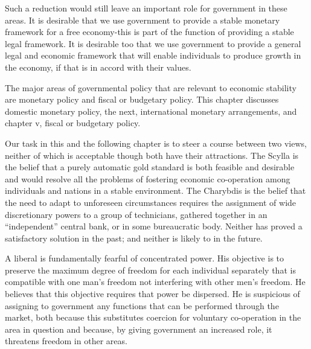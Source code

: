 \documentclass[11pt,openany]{book}
\begin{document}
Such a reduction would still leave an important role for government in these areas. It is desirable that we use government to provide a stable monetary framework for a free economy-this is part of the function of providing a stable legal framework. It is desirable too that we use government to provide a general legal and economic framework that will enable individuals to produce growth in the economy, if that is in accord with their values.

The major areas of governmental policy that are relevant to economic stability are monetary policy and fiscal or budgetary policy. This chapter discusses domestic monetary policy, the next, international monetary arrangements, and chapter v, fiscal or budgetary policy.

Our task in this and the following chapter is to steer a course between two views, neither of which is acceptable though both have their attractions. The Scylla is the belief that a purely automatic gold standard is both feasible and desirable and would resolve all the problems of fostering economic co-operation among individuals and nations in a stable environment. The Charybdis is the belief that the need to adapt to unforeseen circumstances requires the assignment of wide discretionary powers to a group of technicians, gathered together in an ``independent'' central bank, or in some bureaucratic body. Neither has proved a satisfactory solution in the past; and neither is likely to in the future.

A liberal is fundamentally fearful of concentrated power. His objective is to preserve the maximum degree of freedom for each individual separately that is compatible with one man's freedom not interfering with other men's freedom. He believes that this objective requires that power be dispersed. He is suspicious of assigning to government any functions that can be performed through the market, both because this substitutes coercion for voluntary co-operation in the area in question and because, by giving government an increased role, it threatens freedom in other areas.
\end{document}
